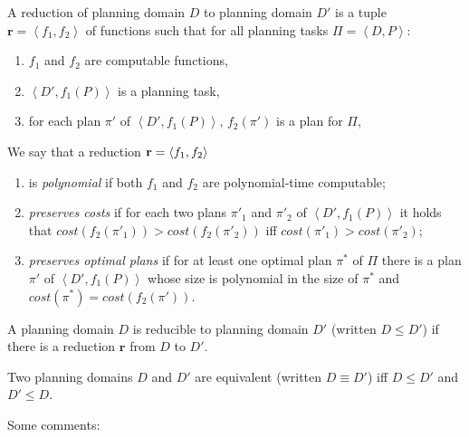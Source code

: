\begin{definition}[Reduction]
A reduction of planning domain $D$ to planning domain $D'$ is a tuple
$\mathbf r=\left<f_1, f_2\right>$ of functions
such that for all planning tasks $\Pi = \left<D, P\right>$:
\begin{enumerate}
    \item $f_1$ and $f_2$ are computable functions,
    \item $\left<D', f_1(P)\right>$ is a planning task,
    \item for each plan $\pi'$ of $\left<D', f_1(P)\right>$, $f_2(\pi')$ is
          a plan for $\Pi$,
\end{enumerate}

We say that a reduction $\mathbf r = \langle f_1,f_2 \rangle$ 
\begin{enumerate}
\item is \emph{polynomial} if both $f_1$ and $f_2$ are 
polynomial-time computable;  

\item \emph{preserves costs} if for each two plans $\pi'_1$ and $\pi'_2$ of $\left<D', f_1(P)\right>$
          it holds that $\textit{cost}(f_2(\pi'_1)) >
          \textit{cost}(f_2(\pi'_2))$ iff $\textit{cost}(\pi'_1) >
          \textit{cost}(\pi'_2)$;

\item \emph{preserves optimal plans} if for at least one optimal plan $\pi^*$ of $\Pi$ there is a
          plan $\pi'$ of $\left<D', f_1(P)\right>$
          whose size is polynomial in the size of $\pi^*$ and
          $\textit{cost}(\pi^*) = \textit{cost}(f_2(\pi'))$.
\end{enumerate}

\end{definition}

\begin{definition}[Reducibility]
A planning domain $D$ is reducible to planning domain $D'$ (written $D\leq D'$)
if there is a reduction $\mathbf r$ from $D$ to $D'$.
\end{definition}

\begin{definition}
Two planning domains $D$ and $D'$ are equivalent (written $D\equiv D'$) iff
$D\leq D'$ and $D'\leq D$.
\end{definition}

Some comments:

